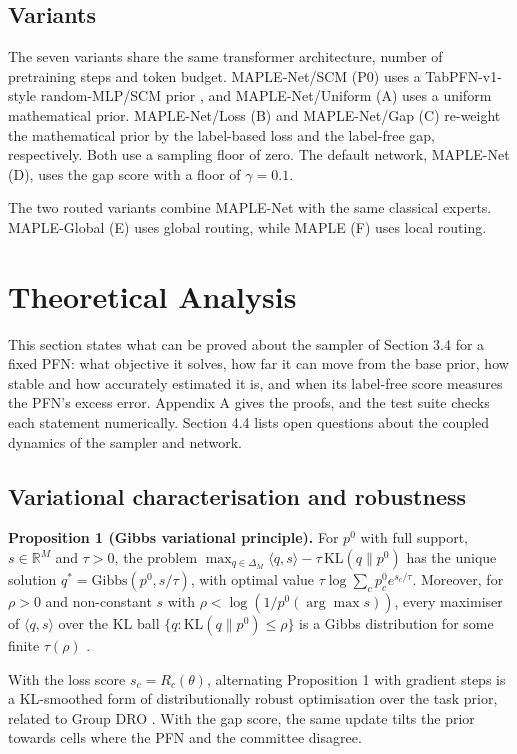\documentclass[mathematics,article,submit,pdftex,moreauthors]{Definitions/mdpi}
\begin{document}
\subsection{Variants}

The seven variants share the same transformer architecture, number of pretraining steps and token budget. MAPLE-Net/SCM (P0) uses a TabPFN-v1-style random-MLP/SCM prior \cite{hollmann2023tabpfn}, and MAPLE-Net/Uniform (A) uses a uniform mathematical prior. MAPLE-Net/Loss (B) and MAPLE-Net/Gap (C) re-weight the mathematical prior by the label-based loss and the label-free gap, respectively. Both use a sampling floor of zero. The default network, MAPLE-Net (D), uses the gap score with a floor of $\gamma=0.1$.

The two routed variants combine MAPLE-Net with the same classical experts. MAPLE-Global (E) uses global routing, while MAPLE (F) uses local routing.

\section{Theoretical Analysis}

This section states what can be proved about the sampler of Section 3.4 for a fixed PFN: what objective it solves, how far it can move from the base prior, how stable and how accurately estimated it is, and when its label-free score measures the PFN's excess error. Appendix A gives the proofs, and the test suite checks each statement numerically. Section 4.4 lists open questions about the coupled dynamics of the sampler and network.

\subsection{Variational characterisation and robustness}

\textbf{Proposition 1 (Gibbs variational principle).} For $p^{0}$ with full support, $s\in\mathbb{R}^{M}$ and $\tau>0$, the problem $\max_{q\in\Delta_M}\langle q,s\rangle-\tau\,\mathrm{KL}(q\|p^{0})$ has the unique solution $q^{*}=\mathrm{Gibbs}(p^{0},s/\tau)$, with optimal value $\tau\log\sum_c p^{0}_c e^{s_c/\tau}$. Moreover, for $\rho>0$ and non-constant $s$ with $\rho<\log(1/p^{0}(\arg\max s))$, every maximiser of $\langle q,s\rangle$ over the KL ball $\{q:\mathrm{KL}(q\|p^{0})\le\rho\}$ is a Gibbs distribution for some finite $\tau(\rho)$ \cite{donsker1975asymptotic,bental2013robust}.

With the loss score $s_c=R_c(\theta)$, alternating Proposition 1 with gradient steps is a KL-smoothed form of distributionally robust optimisation over the task prior, related to Group DRO \cite{sagawa2020distributionally}. With the gap score, the same update tilts the prior towards cells where the PFN and the committee disagree.
\end{document}
